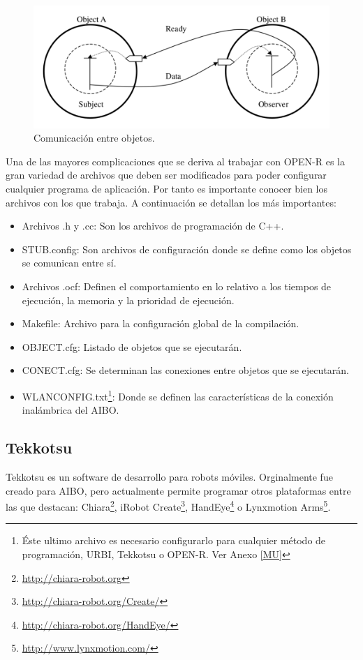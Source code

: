 \documentclass[12pt,a4paper,final,twoside]{book}
\begin{document}
\begin{figure}[h!]
	\centering
    \includegraphics[scale=0.5]{images/ObjectCom.pdf}
	 \caption{Comunicación entre objetos.}
  \label{fig:objectcom}
\end{figure}

Una de las mayores complicaciones que se deriva al trabajar con OPEN-R es la gran variedad de archivos que deben ser modificados para poder configurar cualquier programa de aplicación. Por tanto es importante conocer bien los archivos con los que trabaja.
A continuación se detallan los más importantes: 

\begin{itemize}
\item Archivos .h y .cc: Son los archivos de programación de C++.
\item STUB.config: Son archivos de configuración donde se define como los objetos se comunican entre sí.
\item Archivos .ocf: Definen el comportamiento en lo relativo a los tiempos de ejecución, la memoria y la prioridad de ejecución.
\item Makefile: Archivo para la configuración global de la compilación.
\item OBJECT.cfg: Listado de objetos que se ejecutarán.
\item CONECT.cfg: Se determinan las conexiones entre objetos que se ejecutarán.
\item WLANCONFIG.txt\footnote{Éste ultimo archivo es necesario configurarlo para cualquier método de programación, URBI, Tekkotsu o OPEN-R. Ver Anexo \ref{MU}}: Donde se definen las características de la conexión inalámbrica del AIBO.
\end{itemize}

\subsection{Tekkotsu}
Tekkotsu es un software de desarrollo para robots móviles. Orginalmente fue creado para AIBO, pero actualmente permite programar otros plataformas entre las que destacan: Chiara\footnote{\url{http://chiara-robot.org}}, iRobot Create\footnote{\url{http://chiara-robot.org/Create/}}, HandEye\footnote{\url{http://chiara-robot.org/HandEye/}} o Lynxmotion Arms\footnote{\url{http://www.lynxmotion.com/}}.
\end{document}

